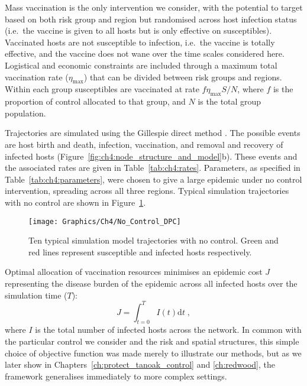 Mass vaccination is the only intervention we consider, with the potential to target based on both risk group and region but randomised across host infection status (i.e.\ the vaccine is given to all hosts but is only effective on susceptibles). Vaccinated hosts are not susceptible to infection, i.e.\ the vaccine is totally effective, and the vaccine does not wane over the time scales considered here. Logistical and economic constraints are included through a maximum total vaccination rate ($\eta_{\mathrm{max}}$) that can be divided between risk groups and regions. Within each group susceptibles are vaccinated at rate $f\eta_{\mathrm{max}}S/N$, where $f$ is the proportion of control allocated to that group, and $N$ is the total group population.

Trajectories are simulated using the Gillespie direct method \citep{gillespie_exact_1977}. The possible events are host birth and death, infection, vaccination, and removal and recovery of infected hosts (Figure~\ref{fig:ch4:node_structure_and_model}b). These events and the associated rates are given in Table~\ref{tab:ch4:rates}. Parameters, as specified in Table~\ref{tab:ch4:parameters}, were chosen to give a large epidemic under no control intervention, spreading across all three regions. Typical simulation trajectories with no control are shown in Figure~\ref{fig:ch4:no_control_dpc}.

\begin{figure}[htb]
    \begin{center}
        \texttt{[image: Graphics/Ch4/No\_Control\_DPC]}
        \caption{Ten typical simulation model trajectories with no control. Green and red lines represent susceptible and infected hosts respectively. \label{fig:ch4:no_control_dpc}}
    \end{center}
\end{figure}

Optimal allocation of vaccination resources minimises an epidemic cost $J$ representing the disease burden of the epidemic across all infected hosts over the simulation time ($T$):
\begin{equation}
    J = \int_{t=0}^TI(t)\mathrm{d}t\;,
\end{equation}
where $I$ is the total number of infected hosts across the network. In common with the particular control we consider and the risk and spatial structures, this simple choice of objective function was made merely to illustrate our methods, but as we later show in Chapters~\ref{ch:protect_tanoak_control} and \ref{ch:redwood}, the framework generalises immediately to more complex settings.

